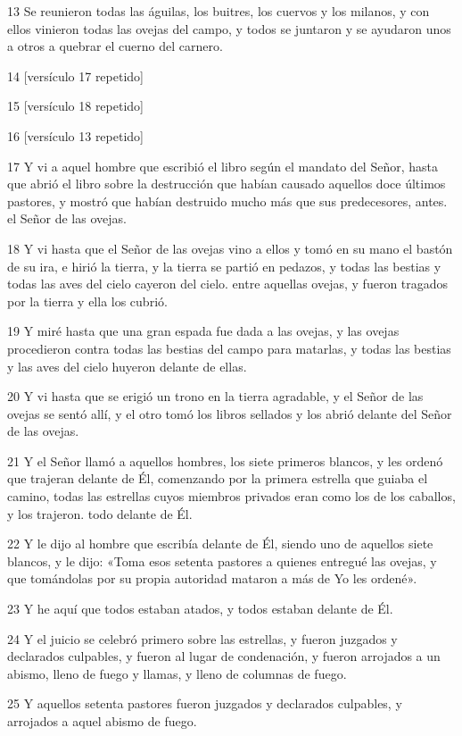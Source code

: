 \par 13 Se reunieron todas las águilas, los buitres, los cuervos y los milanos, y con ellos vinieron todas las ovejas del campo, y todos se juntaron y se ayudaron unos a otros a quebrar el cuerno del carnero.
\par 14 [versículo 17 repetido]
\par 15 [versículo 18 repetido]
\par 16 [versículo 13 repetido]
\par 17 Y vi a aquel hombre que escribió el libro según el mandato del Señor, hasta que abrió el libro sobre la destrucción que habían causado aquellos doce últimos pastores, y mostró que habían destruido mucho más que sus predecesores, antes. el Señor de las ovejas.
\par 18 Y vi hasta que el Señor de las ovejas vino a ellos y tomó en su mano el bastón de su ira, e hirió la tierra, y la tierra se partió en pedazos, y todas las bestias y todas las aves del cielo cayeron del cielo. entre aquellas ovejas, y fueron tragados por la tierra y ella los cubrió.
\par 19 Y miré hasta que una gran espada fue dada a las ovejas, y las ovejas procedieron contra todas las bestias del campo para matarlas, y todas las bestias y las aves del cielo huyeron delante de ellas.
\par 20 Y vi hasta que se erigió un trono en la tierra agradable, y el Señor de las ovejas se sentó allí, y el otro tomó los libros sellados y los abrió delante del Señor de las ovejas.
\par 21 Y el Señor llamó a aquellos hombres, los siete primeros blancos, y les ordenó que trajeran delante de Él, comenzando por la primera estrella que guiaba el camino, todas las estrellas cuyos miembros privados eran como los de los caballos, y los trajeron. todo delante de Él.
\par 22 Y le dijo al hombre que escribía delante de Él, siendo uno de aquellos siete blancos, y le dijo: «Toma esos setenta pastores a quienes entregué las ovejas, y que tomándolas por su propia autoridad mataron a más de Yo les ordené».
\par 23 Y he aquí que todos estaban atados, y todos estaban delante de Él.
\par 24 Y el juicio se celebró primero sobre las estrellas, y fueron juzgados y declarados culpables, y fueron al lugar de condenación, y fueron arrojados a un abismo, lleno de fuego y llamas, y lleno de columnas de fuego.
\par 25 Y aquellos setenta pastores fueron juzgados y declarados culpables, y arrojados a aquel abismo de fuego.
